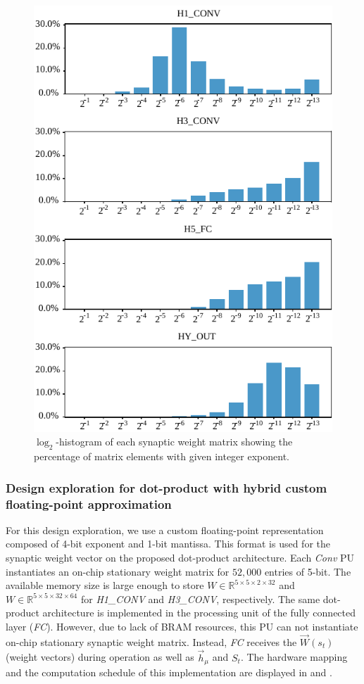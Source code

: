 \begin{figure}[t!]
	\includegraphics[width=\columnwidth]{../figures/log2_histogram.pdf}
	\caption{$\log_2$-histogram of each synaptic weight matrix showing the percentage of matrix elements with given integer exponent.}\label{fig:log2histogram}
\end{figure}

\subsubsection{Design exploration for dot-product with hybrid custom floating-point approximation}
For this design exploration, we use a custom floating-point representation composed of 4-bit exponent and 1-bit mantissa. This format is used for the synaptic weight vector on the proposed dot-product architecture. Each \emph{Conv} PU instantiates an on-chip stationary weight matrix for $52,000$ entries of 5-bit. The available memory size is large enough to store $W\in\mathbb{R}^{5\times 5\times 2\times 32}$ and $W\in\mathbb{R}^{5\times 5\times 32\times 64}$ for \emph{H1\_CONV} and \emph{H3\_CONV}, respectively. The same dot-product architecture is implemented in the processing unit of the fully connected layer (\emph{FC}). However, due to lack of BRAM resources, this PU can not instantiate on-chip stationary synaptic weight matrix. Instead, \emph{FC} receives the $\vec{W}(s_t)$ (weight vectors) during operation as well as $\vec{h}_\mu$ and $S_t$. The hardware mapping and the computation schedule of this implementation are displayed in  and .

